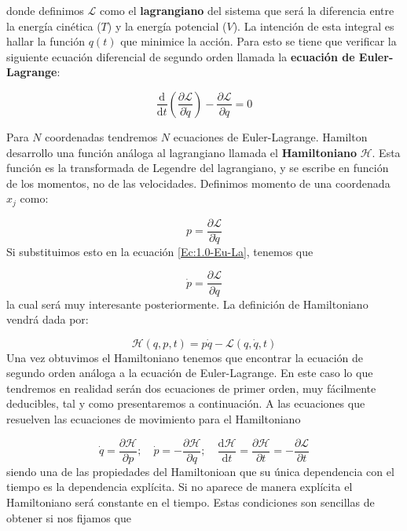 \documentclass[12pt,a4paper]{article}
\numberwithin{equation}{section}
\numberwithin{figure}{section}
\newcommand{\parentesis}[1]{\left( #1  \right)}
\newcommand{\parciales}[2]{\frac{\partial #1}{\partial #2}}
\newcommand{\D}{\mathrm{d}}
\newcommand{\derivadas}[2]{\frac{\D #1}{\D #2}}
\newcommand{\Lcal}{\mathcal{L}}
\newcommand{\Hcal}{\mathcal{H}}
\begin{document}
donde definimos $\Lcal$ como el \textbf{lagrangiano} del sistema que será la diferencia entre la energía cinética ($T$) y la energía potencial ($V$). La intención de esta integral es hallar la función $q(t)$ que minimice la acción. Para esto se tiene que verificar la siguiente ecuación diferencial de segundo orden llamada la \textbf{ecuación de Euler-Lagrange}:

\begin{equation}
\derivadas{}{t} \parentesis{\parciales{\Lcal}{\dot{q}}} - \parciales{\Lcal}{q} = 0 \label{Ec:1.0-Eu-La}
\end{equation}

Para $N$ coordenadas tendremos $N$ ecuaciones de Euler-Lagrange. Hamilton desarrollo una función análoga al lagrangiano llamada el \textbf{Hamiltoniano} $\Hcal$. Esta función es la transformada de Legendre del lagrangiano, y se escribe en función de los momentos, no de las velocidades. Definimos momento de una coordenada $x_j$ como:

\begin{equation} 
p = \parciales{\Lcal}{\dot{q}} \label{Ec:1.0-p}
\end{equation}
Si substituimos esto en la ecuación \ref{Ec:1.0-Eu-La}, tenemos que

\begin{equation}
\dot{p} = \parciales{\Lcal}{q}  \label{Ec:1.0-pdot}
\end{equation}
la cual será muy interesante posteriormente. La definición de Hamiltoniano vendrá dada por:

\begin{equation}
\Hcal(q,p,t) = p \dot{q} - \Lcal(q,\dot{q},t)
\end{equation}
Una vez obtuvimos el Hamiltoniano tenemos que encontrar la ecuación de segundo orden análoga a la ecuación de Euler-Lagrange. En este caso lo que tendremos en realidad serán dos ecuaciones de primer orden, muy fácilmente deducibles, tal y como presentaremos a continuación. A las ecuaciones que resuelven las ecuaciones de movimiento para el Hamiltoniano

\begin{equation}
\dot{q} = \parciales{\Hcal}{p}; \quad \dot{p} = - \parciales{\Hcal}{q}; \quad 
\derivadas{\Hcal}{t} = \parciales{\Hcal}{t} = - \parciales{\Lcal}{t}
\end{equation}
siendo una de las propiedades del Hamiltonioan que su única dependencia con el tiempo es la dependencia explícita. Si no aparece de manera explícita el Hamiltoniano será constante en el tiempo. Estas condiciones son sencillas de obtener si nos fijamos que
\end{document}
